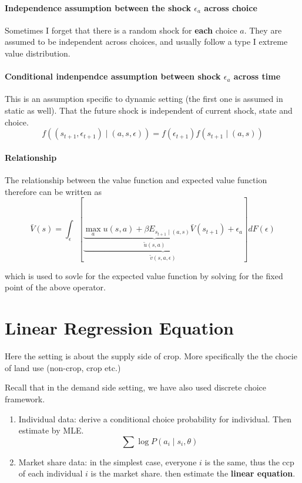 \documentclass[12pt]{article}[margin=1in]
\begin{document}
\paragraph{Independence assumption between the shock $\epsilon_a$ across choice } Sometimes I forget that there is a random shock for \textbf{each} choice $a$. They are assumed to be independent across choices, and usually follow a type I extreme value distribution.
\paragraph{Conditional indenpendce assumption between shock $\epsilon_a$ across time} This is an assumption specific to dynamic setting (the first one is assumed in static as well). 
That the future shock is independent of current shock, state and choice.
$$f((s_{t+1}, \epsilon_{t+1})\mid (a, s, \epsilon)) = f(\epsilon_{t+1})f(s_{t+1}\mid (a, s))$$

\paragraph{Relationship}
The relationship between the value function and expected value function therefore can be written as
$$ \bar{V}(s) = \int_{\epsilon} \left [\underbrace{\underbrace{
                \max_{a}u(s, a) + \beta  E_{s_{t+1}\mid (a, s)} \bar{V}(s_{t+1})}_{\tilde{u}(s,a)} + \epsilon_a}_{\tilde{v}(s,a,\epsilon)}\right] dF(\epsilon)$$

which is used to sovle for the expected value function by solving for the fixed point of the above operator.

\section{Linear Regression Equation}

Here the setting is about the supply side of crop. More specifically the the chocie of land use (non-crop, crop etc.)

Recall that in the demand side setting, we have also used discrete choice framework. 
\begin{enumerate}
    \item Individual data: derive a conditional choice probability for individual. Then estimate by MLE. $$\sum \log P(a_i \mid s_i, \theta)$$
    \item Market share data: in the simplest case, everyone $i$ is the same, thus the ccp of each individual $i$ is the market share. then estimate the \textbf{linear equation}.
\end{enumerate}
\end{document}
